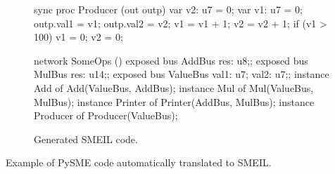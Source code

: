 \begin{widefigure}
\begin{subfigure}[t]{0.49\textwidth}
\begin{smeilcode}
sync proc Producer (out outp)
    var v2: u7 = 0;
    var v1: u7 = 0;
{
    outp.val1 = v1;
    outp.val2 = v2;
    v1 = v1 + 1;
    v2 = v2 + 1;
    if (v1 > 100) {
        v1 = 0;
        v2 = 0;
    }
}

network SomeOps ()
{
    exposed bus AddBus {res: u8;};
    exposed bus MulBus {res: u14;};
    exposed bus ValueBus {val1: u7;
                          val2: u7;};
    instance Add of Add(ValueBus, AddBus);
    instance Mul of Mul(ValueBus, MulBus);
    instance Printer of Printer(AddBus, MulBus);
    instance Producer of Producer(ValueBus);
}

\end{smeilcode}
\caption{Generated SMEIL code.}
\label{fig:someopssme}
\end{subfigure}
\caption{Example of PySME code automatically translated to SMEIL.}
\end{widefigure}


